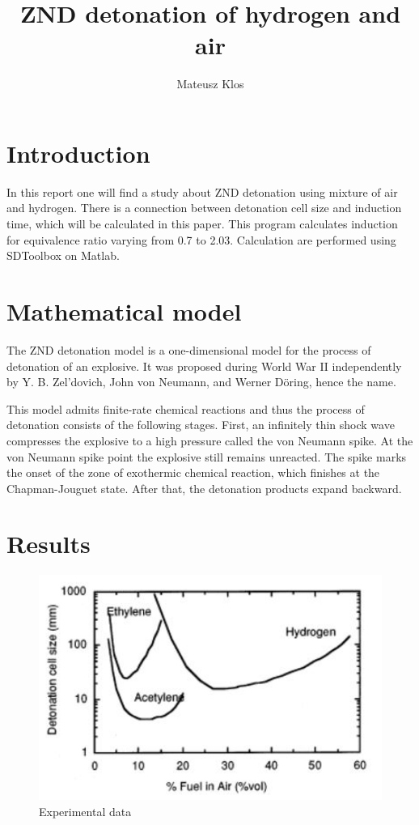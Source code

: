 \documentclass[a4paper]{article}
\title{ZND detonation of hydrogen and air}
\author{Mateusz Klos}
\begin{document}
\maketitle


\section{Introduction}\label{sec:intro}
In this report one will find a study about ZND detonation using mixture of air and hydrogen. There is a connection between detonation cell size and induction time, which will be calculated in this paper. This program calculates induction for equivalence ratio varying from 0.7 to 2.03. Calculation are performed using SDToolbox on Matlab.
\section{Mathematical model}\label{sec:model}
The ZND detonation model is a one-dimensional model for the process of detonation of an explosive. It was proposed during World War II independently by Y. B. Zel'dovich, John von Neumann, and Werner Döring, hence the name.

This model admits finite-rate chemical reactions and thus the process of detonation consists of the following stages. First, an infinitely thin shock wave compresses the explosive to a high pressure called the von Neumann spike. At the von Neumann spike point the explosive still remains unreacted. The spike marks the onset of the zone of exothermic chemical reaction, which finishes at the Chapman-Jouguet state. After that, the detonation products expand backward.
\section{Results}\label{sec:results}

\begin{figure}[H]
\includegraphics[width=1\textwidth]{hydrogen_figure.JPG}
\caption{\label{fig:cj}Experimental data}
\end{figure}
\end{document}
